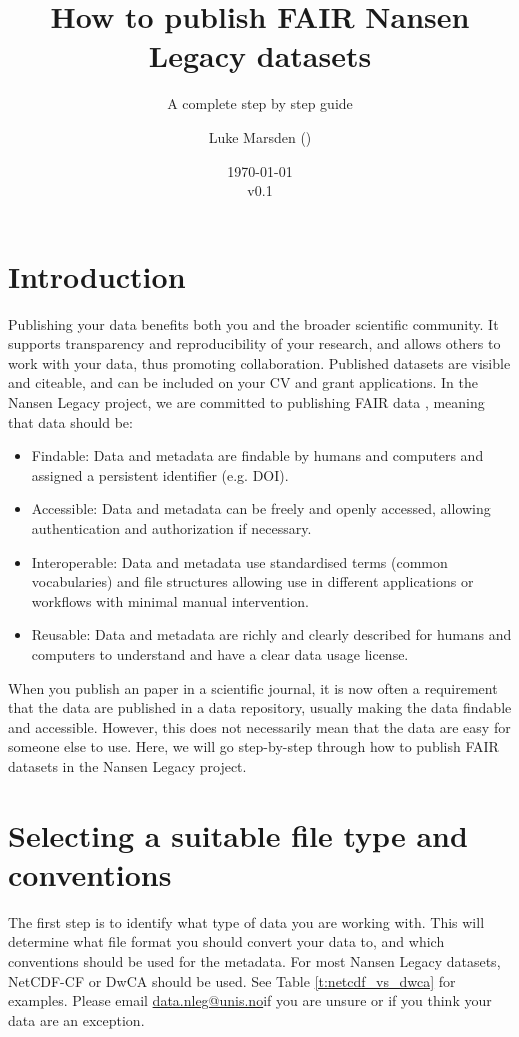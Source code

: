 \documentclass[a4paper,english, 11pt]{article}
\title{How to publish FAIR Nansen Legacy datasets}
\subtitle{A complete step by step guide}
\date{\today\\v0.1}
\author{Luke Marsden (\emailme)}
\makeatletter
\newcommand{\emailme}{\href{mailto:data.nleg@unis.no}{data.nleg@unis.no}}
\makeatother
\begin{document}
\maketitle
\tableofcontents
\pagestyle{fancy}
\newpage
\section{Introduction}
\label{s:Introduction}

Publishing your data benefits both you and the broader scientific community. It supports transparency and reproducibility of your research, and allows others to work with your data, thus promoting collaboration. Published datasets are visible and citeable, and can be included on your CV and grant applications. In the Nansen Legacy project, we are committed to publishing FAIR data \citep{wilkinson2016fair}, meaning that data should be:

\begin{itemize}
\item Findable: Data and metadata are findable by humans and computers and assigned a persistent identifier (e.g. DOI).
\item Accessible: Data and metadata can be freely and openly accessed, allowing authentication and authorization if necessary.
\item Interoperable: Data and metadata use standardised terms (common vocabularies) and file structures allowing use in different applications or workflows with minimal manual intervention. 
\item Reusable: Data and metadata are richly and clearly described for humans and computers to understand and have a clear data usage license. 
\end{itemize}

When you publish an paper in a scientific journal, it is now often a requirement that the data are published in a data repository, usually making the data findable and accessible. However, this does not necessarily mean that the data are easy for someone else to use. Here, we will go step-by-step through how to publish FAIR datasets in the Nansen Legacy project.

\section{Selecting a suitable file type and conventions}
\label{s:FileType}

The first step is to identify what type of data you are working with. This will determine what file format you should convert your data to, and which conventions should be used for the metadata. For most Nansen Legacy datasets, NetCDF-CF or DwCA should be used. See Table \ref{t:netcdf_vs_dwca} for examples. Please email \emailme if you are unsure or if you think your data are an exception.
\end{document}
